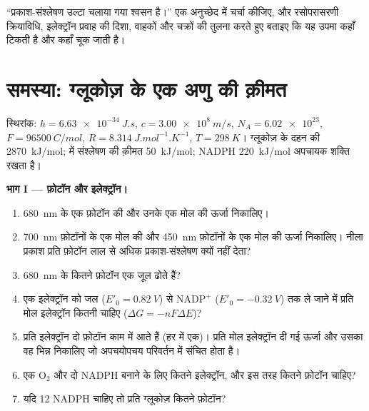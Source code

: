 \begin{exercise}[$\star\star\star$]\label{exo:b1:photosynthesis:12}
``प्रकाश-संश्लेषण उल्टा चलाया गया श्वसन है।'' एक अनुच्छेद में चर्चा कीजिए,
और रसोपरासरणी क्रियाविधि, इलेक्ट्रॉन प्रवाह की दिशा, वाहकों और चक्रों की
तुलना करते हुए बताइए कि यह उपमा कहाँ टिकती है और कहाँ चूक जाती है।
\end{exercise}

\section{समस्या: ग्लूकोज़ के एक अणु की क़ीमत}

\begin{problem}
\label{pb:b1:photosynthesis:1}
स्थिरांक: $h = \qty{6.63e-34}{J.s}$, $c = \qty{3.00e8}{m/s}$,
$N_A = \num{6.02e23}$, $F = \qty{96500}{C/mol}$, $R = \qty{8.314}{J.mol^{-1}.K^{-1}}$,
$T = \qty{298}{K}$। ग्लूकोज़ के दहन की 
\qty{2870}{kJ/mol};  में  संश्लेषण की क़ीमत
\qty{50}{kJ/mol}; NADPH \qty{220}{kJ/mol} अपचायक शक्ति रखता है।

\medskip
\noindent\textbf{भाग I --- फ़ोटॉन और इलेक्ट्रॉन।}
\begin{enumerate}
  \item \qty{680}{nm} के एक फ़ोटॉन की और उनके एक मोल की ऊर्जा
        निकालिए।
  \item \qty{700}{nm} फ़ोटॉनों के एक मोल की और \qty{450}{nm}
        फ़ोटॉनों के एक मोल की ऊर्जा निकालिए। नीला प्रकाश प्रति फ़ोटॉन
        लाल से अधिक प्रकाश-संश्लेषण क्यों नहीं देता?
  \item \qty{680}{nm} के कितने फ़ोटॉन एक जूल ढोते हैं?
  \item एक इलेक्ट्रॉन को जल ($E'_0 = \qty{+0.82}{V}$) से
        $\mathrm{NADP^+}$ ($E'_0 = \qty{-0.32}{V}$) तक ले जाने में प्रति
        मोल इलेक्ट्रॉन कितनी  चाहिए ($\Delta G = -nF\Delta E$)?
  \item प्रति इलेक्ट्रॉन दो फ़ोटॉन काम में आते हैं (हर  में एक)।
        प्रति मोल इलेक्ट्रॉन दी गई ऊर्जा और उसका वह भिन्न निकालिए जो
        अपचयोपचय परिवर्तन में संचित होता है।
  \item एक $\mathrm{O_2}$ और दो NADPH बनाने के लिए कितने इलेक्ट्रॉन,
        और इस तरह कितने फ़ोटॉन चाहिए?
  \item यदि 12 NADPH चाहिए तो प्रति ग्लूकोज़ कितने फ़ोटॉन?
\end{enumerate}


\end{problem}
